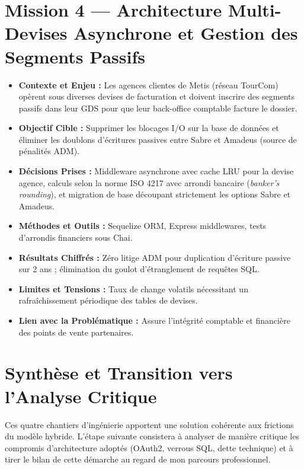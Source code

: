 \documentclass[11pt,a4paper]{article}
\begin{document}
\section{Mission 4 — Architecture Multi-Devises Asynchrone et Gestion des Segments Passifs}
\begin{itemize}[itemsep=2pt]
    \item \textbf{Contexte et Enjeu :} Les agences clientes de Metis (réseau TourCom) opèrent sous diverses devises de facturation et doivent inscrire des segments passifs dans leur GDS pour que leur back-office comptable facture le dossier.
    \item \textbf{Objectif Cible :} Supprimer les blocages I/O sur la base de données et éliminer les doublons d'écritures passives entre Sabre et Amadeus (source de pénalités ADM).
    \item \textbf{Décisions Prises :} Middleware asynchrone avec cache LRU pour la devise agence, calculs selon la norme ISO 4217 avec arrondi bancaire (\textit{banker's rounding}), et migration de base découpant strictement les options Sabre et Amadeus.
    \item \textbf{Méthodes et Outils :} Sequelize ORM, Express middlewares, tests d'arrondis financiers sous Chai.
    \item \textbf{Résultats Chiffrés :} Zéro litige ADM pour duplication d'écriture passive sur 2 ans ; élimination du goulot d'étranglement de requêtes SQL.
    \item \textbf{Limites et Tensions :} Taux de change volatils nécessitant un rafraîchissement périodique des tables de devises.
    \item \textbf{Lien avec la Problématique :} Assure l'intégrité comptable et financière des points de vente partenaires.
\end{itemize}

\section{Synthèse et Transition vers l'Analyse Critique}
Ces quatre chantiers d'ingénierie apportent une solution cohérente aux frictions du modèle hybride. L'étape suivante consistera à analyser de manière critique les compromis d'architecture adoptés (OAuth2, verrous SQL, dette technique) et à tirer le bilan de cette démarche au regard de mon parcours professionnel.
\end{document}
